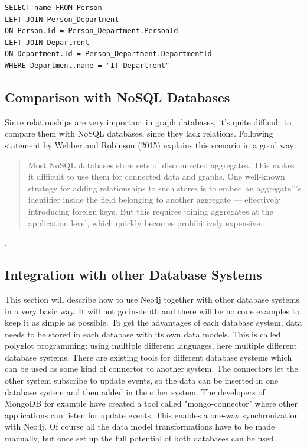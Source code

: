 \begin{lstlisting}[frame=single, caption=SQL Statement, label=gsqlstm]
SELECT name FROM Person
LEFT JOIN Person_Department
ON Person.Id = Person_Department.PersonId
LEFT JOIN Department
ON Department.Id = Person_Department.DepartmentId
WHERE Department.name = "IT Department"
\end{lstlisting}

\subsection{Comparison with NoSQL Databases}

Since relationships are very important in graph databases, it's quite difficult to compare them with NoSQL databases, since they lack relations. Following statement by Webber and Robinson (2015) explains this scenario in a good way:
\begin{quotation}
	Most NoSQL databases store sets of disconnected aggregates. This makes it difficult to use them for connected data and graphs.
	One well-known strategy for adding relationships to such stores is to embed an aggregate'’'s identifier inside the field belonging to another aggregate — effectively introducing foreign keys.
	But this requires joining aggregates at the application level, which quickly becomes prohibitively expensive.
\end{quotation} \cite[p. 15]{Webber.Robinson.2015}.

\subsection{Integration with other Database Systems}
This section will describe how to use Neo4j together with other database systems in a very basic way. It will not go in-depth and there will be no code examples to keep it as simple as possible.
To get the advantages of each database system, data needs to be stored in each database with its own data models. This is called polyglot programming: using multiple different languages, here multiple different database systems. There are existing tools for different database systems which can be used as some kind of connector to another system. The connectors let the other system subscribe to update events, so the data can be inserted in one database system and then added in the other system. The developers of MongoDB for example have created a tool called "mongo-connector" where other applications can listen for update events. This enables a one-way synchronization with Neo4j. Of course all the data model transformations have to be made manually, but once set up the full potential of both databases can be used.

